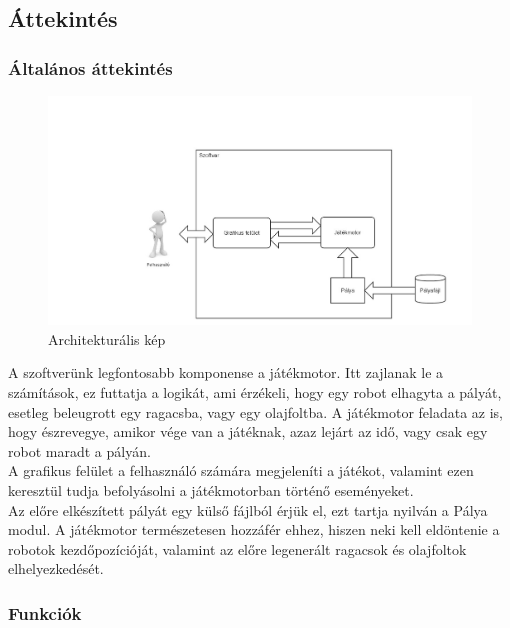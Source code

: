 

\subsection{Áttekintés}

\subsubsection{Általános áttekintés}

\begin{figure}[ht!]
	\centering
	\includegraphics[width=180mm, center]{./section2/dia1.jpg}
	\caption{Architekturális kép \label{overflow}}
\end{figure}

A szoftverünk legfontosabb komponense a játékmotor. Itt zajlanak le a számítások, ez futtatja a logikát, ami érzékeli, hogy egy robot elhagyta a pályát, esetleg beleugrott egy ragacsba, vagy egy olajfoltba. A játékmotor feladata az is, hogy észrevegye, amikor vége van a játéknak, azaz lejárt az idő, vagy csak egy robot maradt a pályán. \\

A grafikus felület a felhasználó számára megjeleníti a játékot, valamint ezen keresztül tudja befolyásolni a játékmotorban történő eseményeket. \\

Az előre elkészített pályát egy külső fájlból érjük el, ezt tartja nyilván a Pálya modul. A játékmotor természetesen hozzáfér ehhez, hiszen neki kell eldöntenie a robotok kezdőpozícióját, valamint az előre legenerált ragacsok és olajfoltok elhelyezkedését. \\

\subsubsection{Funkciók}


